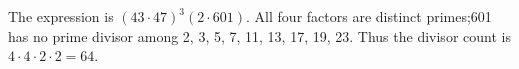 The expression is $(43\cdot47)^3(2\cdot601)$. All four factors are distinct primes;601 has no prime divisor among 2, 3, 5, 7, 11, 13, 17, 19, 23. Thus the divisor count is $4\cdot4\cdot2\cdot2=\boxed{64}$.

